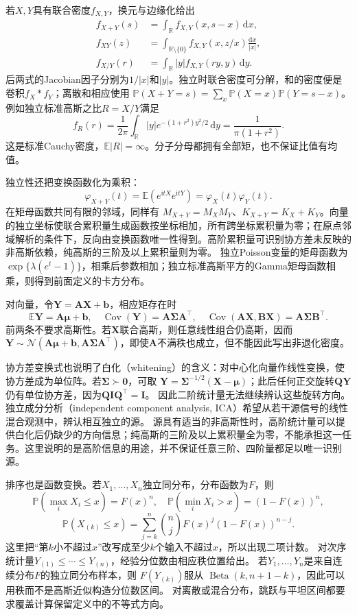 若\(X,Y\)具有联合密度\(f_{X,Y}\)，换元与边缘化给出
\[
\begin{aligned}
f_{X+Y}(s)&=\int_{\mathbb R}f_{X,Y}(x,s-x)\,\mathrm dx,\\
f_{XY}(z)&=\int_{\mathbb R\setminus\{0\}}
 f_{X,Y}(x,z/x)\frac{\mathrm dx}{|x|},\\
f_{X/Y}(r)&=\int_{\mathbb R}|y|f_{X,Y}(ry,y)\,\mathrm dy.
\end{aligned}
\]
后两式的Jacobian因子分别为\(1/|x|\)和\(|y|\)。独立时联合密度可分解，和的密度便是卷积\(f_X*f_Y\)；离散和相应使用
\(\mathbb P(X+Y=s)=\sum_x\mathbb P(X=x)\mathbb P(Y=s-x)\)。
例如独立标准高斯之比\(R=X/Y\)满足
\[
f_R(r)=\frac1{2\pi}\int_{\mathbb R}|y|
 e^{-(1+r^2)y^2/2}\,\mathrm dy
=\frac1{\pi(1+r^2)}.
\]
这是标准Cauchy密度，\(\mathbb E|R|=\infty\)。分子分母都拥有全部矩，也不保证比值有均值。

独立性还把变换函数化为乘积：
\[
\varphi_{X+Y}(t)=\mathbb E(e^{\mathrm itX}e^{\mathrm itY})
=\varphi_X(t)\varphi_Y(t).
\]
在矩母函数共同有限的邻域，同样有
\(M_{X+Y}=M_XM_Y\)、\(K_{X+Y}=K_X+K_Y\)。向量的独立坐标使联合累积量生成函数按坐标相加，所有跨坐标累积量为零；在原点邻域解析的条件下，反向由变换函数唯一性得到。高阶累积量可识别协方差未反映的非高斯依赖，纯高斯的三阶及以上累积量则为零。
独立Poisson变量的矩母函数为
\(\exp\{\lambda(e^t-1)\}\)，相乘后参数相加；独立标准高斯平方的Gamma矩母函数相乘，则得到前面定义的卡方分布。

对向量，令\(\bm Y=\bm A\bm X+\bm b\)，相应矩存在时
\[
\mathbb E\bm Y=\bm A\bm\mu+\bm b,\quad
\operatorname{Cov}(\bm Y)=\bm A\bm\Sigma\bm A^\top,\quad
\operatorname{Cov}(\bm A\bm X,\bm B\bm X)=\bm A\bm\Sigma\bm B^\top.
\]
前两条不要求高斯性。若\(\bm X\)联合高斯，则任意线性组合仍高斯，因而
\(\bm Y\sim\mathcal N(\bm A\bm\mu+\bm b,\bm A\bm\Sigma\bm A^\top)\)，即使\(\bm A\)不满秩也成立，但不能因此写出非退化密度。

协方差变换式也说明了白化（whitening）的含义：对中心化向量作线性变换，使协方差成为单位阵。若\(\bm\Sigma\succ\bm0\)，可取
\(\bm Y=\bm\Sigma^{-1/2}(\bm X-\bm\mu)\)；此后任何正交旋转\(\bm Q\bm Y\)仍有单位协方差，因为\(\bm Q\bm I\bm Q^\top=\bm I\)。
因此二阶统计量无法继续辨认这些旋转方向。独立成分分析（independent component analysis, ICA）希望从若干源信号的线性混合观测中，辨认相互独立的源。
源具有适当的非高斯性时，高阶统计量可以提供白化后仍缺少的方向信息；纯高斯的三阶及以上累积量全为零，不能承担这一任务。这里说明的是高阶信息的用途，并不保证任意三阶、四阶量都足以唯一识别源。

排序也是函数变换。若\(X_1,\ldots,X_n\)独立同分布，分布函数为\(F\)，则
\[
\mathbb P(\max_iX_i\leq x)=F(x)^n,\quad
\mathbb P(\min_iX_i>x)=(1-F(x))^n,
\]
\[
\mathbb P(X_{(k)}\leq x)
=\sum_{j=k}^n\binom njF(x)^j(1-F(x))^{n-j}.
\]
这里把“第\(k\)小不超过\(x\)”改写成至少\(k\)个输入不超过\(x\)，所以出现二项计数。
对次序统计量\(Y_{(1)}\leq\cdots\leq Y_{(n)}\)，经验分位数由相应秩位置给出。
若\(Y_1,\ldots,Y_n\)是来自连续分布\(F\)的独立同分布样本，则
\(F(Y_{(k)})\)服从
\(\operatorname{Beta}(k,n+1-k)\)，因此可以用秩而不是高斯近似构造分位数区间。
对离散或混合分布，跳跃与平坦区间都要求覆盖计算保留定义中的不等式方向。

